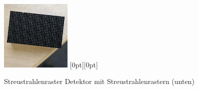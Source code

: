 \documentclass[a4paper,12pt]{article}
\theoremstyle{definition}
\theoremstyle{remark}
\begin{document}
\begin{figure}[ht]
    \centering
    \includegraphics[width=0.30\textwidth]{Bilder/Raster.jpg}%
    \hspace{0.03\textwidth}%
    \raisebox{0pt}[0pt][0pt]{}
    \caption{Streustrahlenraster \quad \quad \quad \quad \quad \quad  Detektor mit Streustrahlenrastern (unten)}
\end{figure}
\end{document}
